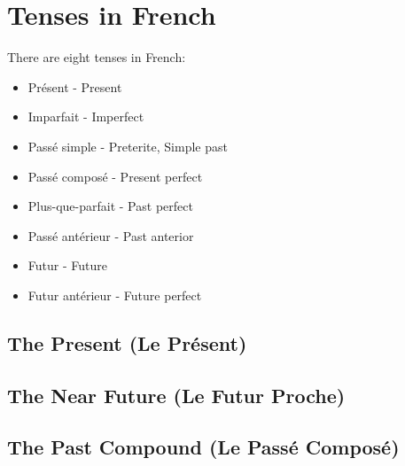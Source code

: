 \section{Tenses in French}

There are eight tenses in French:

\begin{itemize}
\item{Pr\'esent - Present}
\item{Imparfait - Imperfect}
\item{Pass\'e simple - Preterite, Simple past}
\item{Pass\'e compos\'e - Present perfect}
\item{Plus-que-parfait - Past perfect}
\item{Pass\'e ant\'erieur - Past anterior}
\item{Futur - Future}
\item{Futur ant\'erieur - Future perfect}
\end{itemize}


\subsection{The Present (Le Pr\'esent)}

\subsection{The Near Future (Le Futur Proche)}

\subsection{The Past Compound (Le Pass\'e Compos\'e)}
